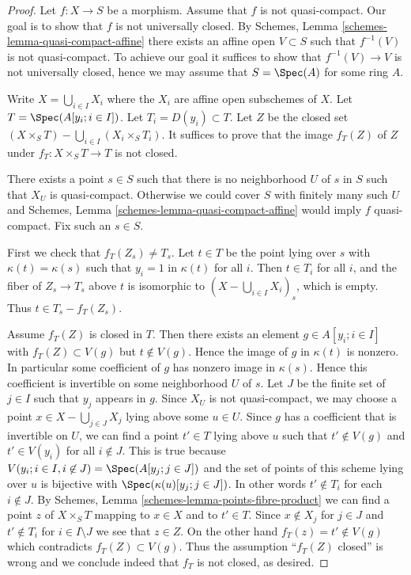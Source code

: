 \begin{proof}
Let $f : X \to S$ be a morphism. Assume that $f$ is not quasi-compact.
Our goal is to show that $f$ is not universally closed. By
Schemes, Lemma \ref{schemes-lemma-quasi-compact-affine}
there exists an affine open $V \subset S$ such that $f^{-1}(V)$ is
not quasi-compact. To achieve our goal it suffices to show that
$f^{-1}(V) \to V$ is not universally closed, hence we may assume that
$S = \Spec(A)$ for some ring $A$.

\medskip\noindent
Write $X = \bigcup_{i \in I} X_i$ where the $X_i$ are affine open subschemes
of $X$.  Let $T = \Spec(A[y_i ; i \in I])$.
Let $T_i = D(y_i) \subset T$. Let $Z$ be the closed set
$(X \times_S T) - \bigcup_{i \in I} (X_i \times_S T_i)$.  It suffices to
prove that the image $f_T(Z)$ of $Z$ under $f_T : X \times_S T \to T$
is not closed.

\medskip\noindent
There exists a point $s \in S$ such that there is no
neighborhood $U$ of $s$ in $S$ such that $X_U$ is quasi-compact.
Otherwise we could cover $S$ with finitely many such $U$ and
Schemes, Lemma \ref{schemes-lemma-quasi-compact-affine}
would imply $f$ quasi-compact. Fix such an $s \in S$.

\medskip\noindent
First we check that $f_T(Z_s) \ne T_s$.  Let $t \in T$ be the point
lying over $s$ with $\kappa(t) = \kappa(s)$ such that $y_i = 1$ in
$\kappa(t)$ for all $i$.
Then $t \in T_i$ for all $i$, and the fiber of $Z_s \to T_s$ above
$t$ is isomorphic to $(X - \bigcup_{i \in I} X_i)_s$, which is empty.
Thus $t \in T_s - f_T(Z_s)$.

\medskip\noindent
Assume $f_T(Z)$ is closed in $T$. Then there exists an element
$g \in A[y_i; i \in I]$ with $f_T(Z) \subset V(g)$ but $t \not \in V(g)$.
Hence the image of $g$ in $\kappa(t)$ is nonzero. In particular some
coefficient of $g$ has nonzero image in $\kappa(s)$. Hence this coefficient is
invertible on some neighborhood $U$ of $s$. Let $J$ be the finite set of
$j \in I$ such that $y_j$ appears in $g$. Since $X_U$ is not quasi-compact,
we may choose a point $x \in X - \bigcup_{j \in J} X_j$ lying above some
$u \in U$. Since $g$ has a coefficient that is invertible on $U$, we can
find a point $t' \in T$ lying above $u$ such that $t' \not \in V(g)$ and
$t' \in V(y_i)$ for all $i \notin J$. This is true because
$V(y_i; i \in I, i \not\in J) = \Spec(A[y_j; j\in J])$
and the set of points of this scheme lying over $u$ is bijective
with $\Spec(\kappa(u)[y_j; j \in J])$. In other words $t' \notin T_i$
for each $i \notin J$. By
Schemes, Lemma \ref{schemes-lemma-points-fibre-product}
we can find a point $z$ of $X \times_S T$ mapping to $x \in X$ and to
$t' \in T$. Since $x \not \in X_j$ for $j \in J$ and $t' \not \in T_i$
for $i \in I \setminus J$ we see that $z \in Z$. On the other hand
$f_T(z) = t' \not \in V(g)$ which contradicts $f_T(Z) \subset V(g)$.
Thus the assumption ``$f_T(Z)$ closed'' is wrong and we conclude indeed
that $f_T$ is not closed, as desired.
\end{proof}

